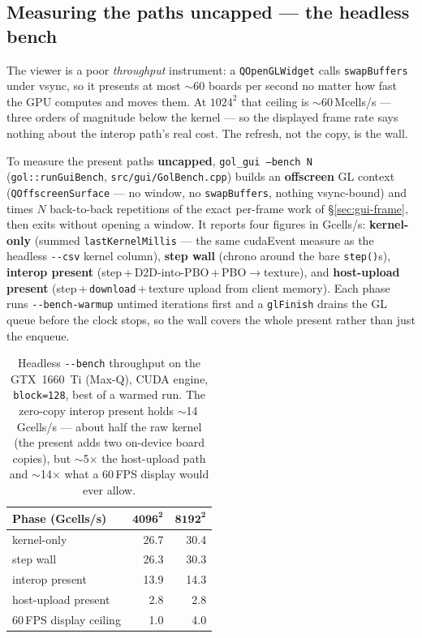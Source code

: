 \documentclass[
	english,
	letterpaper, oneside
]{article}
\begin{document}
\subsection{Measuring the paths uncapped --- the headless bench}
\label{sec:gui-bench}

The viewer is a poor \emph{throughput} instrument: a \texttt{QOpenGLWidget} calls
\texttt{swapBuffers} under vsync, so it presents at most $\sim$60 boards per second
no matter how fast the GPU computes and moves them. At $1024^2$ that ceiling is
$\sim$60\,Mcells/s --- three orders of magnitude below the kernel --- so the
displayed frame rate says nothing about the interop path's real cost. The
refresh, not the copy, is the wall.

To measure the present paths \textbf{uncapped}, \texttt{gol\_gui --bench N}
(\texttt{gol::runGuiBench}, \texttt{src/gui/GolBench.cpp}) builds an
\textbf{offscreen} GL context (\texttt{QOffscreenSurface} --- no window, no
\texttt{swapBuffers}, nothing vsync-bound) and times $N$ back-to-back repetitions
of the exact per-frame work of \S\ref{sec:gui-frame}, then exits without opening a
window. It reports four figures in Gcells/s: \textbf{kernel-only} (summed
\texttt{lastKernelMillis} --- the same cudaEvent measure as the headless
\texttt{-{}-csv} kernel column), \textbf{step wall} (chrono around the bare
\texttt{step()}s), \textbf{interop present} (step\,+\,D2D-into-PBO\,+\,PBO$\to$texture),
and \textbf{host-upload present} (step\,+\,\texttt{download}\,+\,texture upload from
client memory). Each phase runs \texttt{-{}-bench-warmup} untimed iterations first
and a \texttt{glFinish} drains the GL queue before the clock stops, so the wall
covers the whole present rather than just the enqueue.

\begin{table}[H]
	\centering
	\caption{Headless \texttt{-{}-bench} throughput on the GTX~1660~Ti (Max-Q),
	CUDA engine, \texttt{block=128}, best of a warmed run. The zero-copy interop
	present holds $\sim$14\,Gcells/s --- about half the raw kernel (the present
	adds two on-device board copies), but $\sim$5$\times$ the host-upload path and
	$\sim$14$\times$ what a 60\,FPS display would ever allow.}
	\label{tab:gui-bench}
	\begin{tabular}{@{}lrr@{}}
		\toprule
		\textbf{Phase} (Gcells/s) & $\mathbf{4096^2}$ & $\mathbf{8192^2}$ \\
		\midrule
		kernel-only              & 26.7 & 30.4 \\
		step wall                & 26.3 & 30.3 \\
		interop present          & 13.9 & 14.3 \\
		host-upload present      & \phantom{0}2.8 & \phantom{0}2.8 \\
		\midrule
		60\,FPS display ceiling  & \phantom{0}1.0 & \phantom{0}4.0 \\
		\bottomrule
	\end{tabular}
\end{table}
\end{document}
